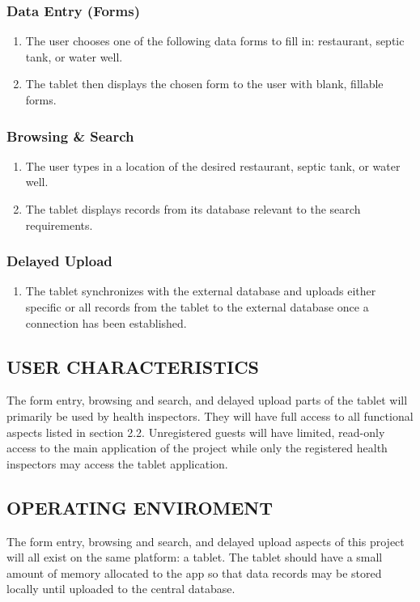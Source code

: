 \documentclass[twoside,letterpaper]{article}
\begin{document}
\subsubsection{Data Entry (Forms)}
\begin{enumerate}
\item{The user chooses one of the following data forms to fill in: restaurant, septic tank, or water well.}
\item{The tablet then displays the chosen form to the user with blank, fillable forms.}
\end{enumerate}
\subsubsection{Browsing \& Search}
\begin{enumerate}
\item{The user types in a location of the desired restaurant, septic tank, or water well.}
\item{The tablet displays records from its database relevant to the search requirements.}
\end{enumerate}
\subsubsection{Delayed Upload}
\begin{enumerate}
\item{The tablet synchronizes with the external database and uploads either specific or all records from the tablet to the external database once a connection has been established.}
\end{enumerate}

\subsection[USER
CHARACTERISTICS]{\rmfamily\bfseries\color{black}
USER CHARACTERISTICS}
{\rmfamily\color{black}
The form entry, browsing and search, and delayed upload parts of the tablet will primarily be used by health inspectors. They will have full access to all functional aspects listed in section 2.2. Unregistered guests will have limited, read-only access to the main application of the project while only the registered health inspectors may access the tablet application.}

\subsection[OPERATING ENVIRONMENT]{\rmfamily\bfseries\color{black}
OPERATING ENVIROMENT}
{\rmfamily\color{black}
The form entry, browsing and search, and delayed upload aspects of this project will all exist on the same platform: a tablet. The tablet should have a small amount of memory allocated to the app so that data records may be stored locally until uploaded to the central database.}
\end{document}
